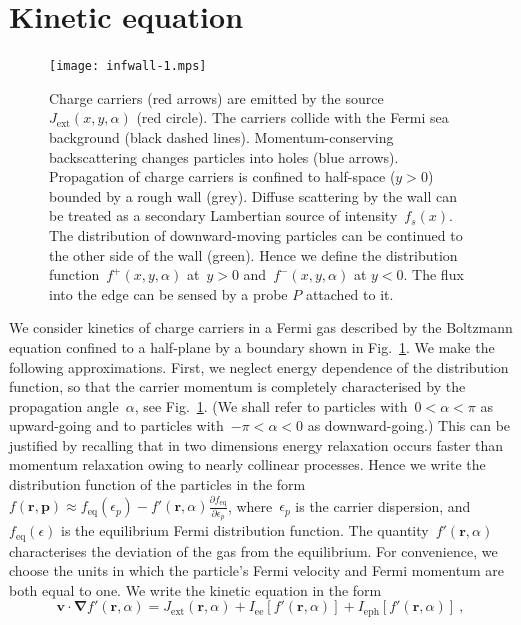\documentclass[preprint,aps,eqsecnum]{revtex4-1}
\newcommand{\fplus}[1]{{#1}^{+}}
\newcommand{\fminus}[1]{{#1}^{-}}
\begin{document}
\section{Kinetic equation}
\label{sec:boltzmann}
\begin{figure}
   \texttt{[image: infwall-1.mps]}
  \caption{
  \label{fig:setup}
  Charge carriers (red arrows) are emitted by the
  source~$J_\mathrm{ext}(x, y, \alpha)$ (red circle). The carriers collide with
  the Fermi sea  background (black dashed lines). Momentum-conserving backscattering
  changes particles into holes (blue arrows). Propagation of charge carriers
  is confined to half-space ($y > 0$) bounded by a rough wall (grey).
  Diffuse scattering by the wall can be treated as a secondary
  Lambertian source of intensity~$f_s(x)$. The distribution of downward-moving
  particles can be continued to the other side of the wall (green).
  Hence we define  the distribution function~$\fplus{f}(x, y, \alpha)$
  at~$y > 0$ and~$\fminus{f}(x, y, \alpha)$ at $y < 0$. The flux into
  the edge can be sensed by a probe $P$ attached to it.  
}
\end{figure}
We consider kinetics of charge carriers in a Fermi gas
described by the Boltzmann equation
confined to a half-plane by a boundary shown in Fig.~\ref{fig:setup}.
We make the following approximations. First, we neglect
energy dependence of the distribution function, so that the carrier momentum
is completely characterised by the propagation angle~$\alpha$, see
Fig.~\ref{fig:setup}. (We shall refer to particles with~$0 < \alpha < \pi$
as upward-going and to particles with~$-\pi < \alpha < 0$ as downward-going.)
This can be justified by recalling that in two dimensions
energy relaxation occurs faster than momentum
relaxation\cite{bib:momentum-relaxation} owing to nearly collinear processes.
Hence  we write the distribution function
of the particles in the form~$f({\bm r}, {\bm p})
\approx f_{\mathrm{eq}}(\epsilon_p)
- f' ({\bm r}, \alpha) \frac{\partial f_{\mathrm{eq}}}{\partial \epsilon_p}$,
where~$\epsilon_p$ is the carrier dispersion, and~$f_\mathrm{eq}(\epsilon)$
is the equilibrium Fermi distribution function.
The quantity~$f'({\bm r}, \alpha)$ characterises the deviation of the gas
from the equilibrium.
For convenience, we choose the units in which the particle's
Fermi velocity and Fermi momentum are both equal to one.
We write the kinetic equation in the form
\begin{equation}
  \label{eq:boltzmann-eqn}
{\bm v}\cdot{\bm \nabla} f'({\bm r}, \alpha)
= J_{\mathrm{ext}}({\bm r}, \alpha) + I_\mathrm{ee}[f'({\bm r}, \alpha)]
+ I_\mathrm{eph}[f'({\bm r}, \alpha)]
\ ,
\end{equation}
\end{document}
